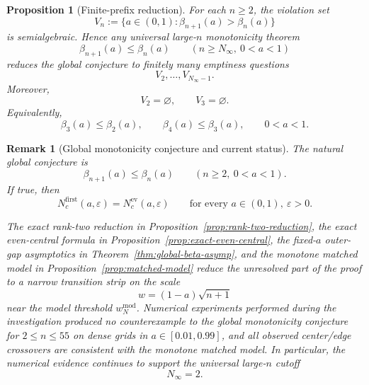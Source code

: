 \documentclass[11pt]{article}
\numberwithin{equation}{section}
\newtheorem{proposition}[theorem]{Proposition}
\newtheorem{remark}[theorem]{Remark}
\begin{document}
\begin{proposition}[Finite-prefix reduction]
\label{prop:finite-prefix-reduction}
For each \(n\ge2\), the violation set
\[
V_n:=\{a\in(0,1):\beta_{n+1}(a)>\beta_n(a)\}
\]
is semialgebraic. Hence any universal large-\(n\) monotonicity theorem
\[
\beta_{n+1}(a)\le\beta_n(a)
\qquad(n\ge N_\infty,\ 0<a<1)
\]
reduces the global conjecture to finitely many emptiness questions
\[
V_2,\dots,V_{N_\infty-1}.
\]
Moreover,
\[
V_2=\varnothing,
\qquad
V_3=\varnothing.
\]
Equivalently,
\[
\beta_3(a)\le \beta_2(a),\qquad
\beta_4(a)\le \beta_3(a),
\qquad 0<a<1.
\]
\end{proposition}

\begin{remark}[Global monotonicity conjecture and current status]
\label{rem:global-beta-conjecture}
The natural global conjecture is
\[
\beta_{n+1}(a)\le \beta_n(a)
\qquad
(n\ge2,\ 0<a<1).
\]
If true, then
\[
N_c^{\mathrm{first}}(a,\varepsilon)=N_c^{\mathrm{ev}}(a,\varepsilon)
\qquad
\text{for every }a\in(0,1),\ \varepsilon>0.
\]

The exact rank-two reduction in
Proposition~\ref{prop:rank-two-reduction}, the exact even-central formula in
Proposition~\ref{prop:exact-even-central}, the fixed-\(a\) outer-gap asymptotics in
Theorem~\ref{thm:global-beta-asymp}, and the monotone matched model in
Proposition~\ref{prop:matched-model} reduce the unresolved part of the proof to a
narrow transition strip on the scale
\[
w=(1-a)\sqrt{n+1}
\]
near the model threshold \(w_N^{\mathrm{mod}}\). Numerical experiments performed
during the investigation produced no counterexample to the global monotonicity
conjecture for \(2\le n\le55\) on dense grids in \(a\in[0.01,0.99]\), and all
observed center/edge crossovers are consistent with the monotone matched model.
In particular, the numerical evidence continues to support the universal large-\(n\)
cutoff
\[
N_\infty=2.
\]
\end{remark}
\end{document}

